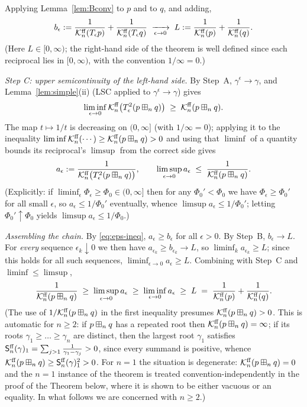 \medskip
Applying Lemma~\ref{lem:Bconv} to $p$ and to $q$, and adding,
\[
b_\epsilon:=\frac{1}{\mathcal{K}^{\mathrm{ff}}_n(T_\epsilon p)}+\frac{1}{\mathcal{K}^{\mathrm{ff}}_n(T_\epsilon q)}
\;\xrightarrow[\epsilon\to0]{}\;
L:=\frac{1}{\mathcal{K}^{\mathrm{ff}}_n(p)}+\frac{1}{\mathcal{K}^{\mathrm{ff}}_n(q)} .
\]
(Here $L\in[0,\infty)$; the right-hand side of the theorem is well defined since
each reciprocal lies in $[0,\infty)$, with the convention $1/\infty=0$.)

\medskip
\noindent\textit{Step C: upper semicontinuity of the left-hand side.}
By Step~A, $\gamma^\epsilon\to\gamma$, and Lemma~\ref{lem:simple}(ii) (LSC applied
to $\gamma^\epsilon\to\gamma$) gives
\[
\liminf_{\epsilon\to 0}\mathcal{K}^{\mathrm{ff}}_n\bigl(T_\epsilon^2(p\boxplus_n q)\bigr)\;\ge\;\mathcal{K}^{\mathrm{ff}}_n(p\boxplus_n q).
\]
The map $t\mapsto 1/t$ is decreasing on $(0,\infty]$ (with $1/\infty=0$); applying
it to the inequality $\liminf \mathcal{K}^{\mathrm{ff}}_n(\cdots)\ge\mathcal{K}^{\mathrm{ff}}_n(p\boxplus_n q)>0$ and
using that $\liminf$ of a quantity bounds its reciprocal's $\limsup$ from the
correct side gives
\[
a_\epsilon:=\frac{1}{\mathcal{K}^{\mathrm{ff}}_n\bigl(T_\epsilon^2(p\boxplus_n q)\bigr)},\qquad
\limsup_{\epsilon\to 0}a_\epsilon\;\le\;\frac{1}{\mathcal{K}^{\mathrm{ff}}_n(p\boxplus_n q)}.
\]
(Explicitly: if $\liminf_\epsilon\Phi_\epsilon\ge\Phi_0\in(0,\infty]$ then for any
$\Phi_0'<\Phi_0$ we have $\Phi_\epsilon\ge\Phi_0'$ for all small $\epsilon$, so
$a_\epsilon\le 1/\Phi_0'$ eventually, whence $\limsup a_\epsilon\le 1/\Phi_0'$;
letting $\Phi_0'\uparrow\Phi_0$ yields $\limsup a_\epsilon\le 1/\Phi_0$.)

\medskip
\noindent\textit{Assembling the chain.}
By \eqref{eq:eps-ineq}, $a_\epsilon\ge b_\epsilon$ for all $\epsilon>0$. By Step~B,
$b_\epsilon\to L$. For \emph{every} sequence $\epsilon_k\downarrow 0$ we then have
$a_{\epsilon_k}\ge b_{\epsilon_k}\to L$, so $\liminf_{k}a_{\epsilon_k}\ge L$;
since this holds for all such sequences, $\liminf_{\epsilon\to0}a_\epsilon\ge L$.
Combining with Step~C and $\liminf\le\limsup$,
\[
\frac{1}{\mathcal{K}^{\mathrm{ff}}_n(p\boxplus_n q)}
\;\ge\;\limsup_{\epsilon\to 0}a_\epsilon
\;\ge\;\liminf_{\epsilon\to 0}a_\epsilon
\;\ge\;L
\;=\;\frac{1}{\mathcal{K}^{\mathrm{ff}}_n(p)}+\frac{1}{\mathcal{K}^{\mathrm{ff}}_n(q)}.
\]
(The use of $1/\mathcal{K}^{\mathrm{ff}}_n(p\boxplus_n q)$ in the first inequality presumes
$\mathcal{K}^{\mathrm{ff}}_n(p\boxplus_n q)>0$. This is automatic for $n\ge 2$: if $p\boxplus_n q$ has
a repeated root then $\mathcal{K}^{\mathrm{ff}}_n(p\boxplus_n q)=\infty$; if its roots
$\gamma_1\ge\dots\ge\gamma_n$ are distinct, then the largest root $\gamma_1$
satisfies $\mathsf{S}^{\mathrm{ff}}_n(\gamma)_1=\sum_{j>1}\frac{1}{\gamma_1-\gamma_j}>0$, since
every summand is positive, whence $\mathcal{K}^{\mathrm{ff}}_n(p\boxplus_n q)\ge\mathsf{S}^{\mathrm{ff}}_n(\gamma)_1^2>0$.
For $n=1$ the situation is degenerate: $\mathcal{K}^{\mathrm{ff}}_n(p\boxplus_n q)=0$ and the
$n=1$ instance of the theorem is treated convention-independently in the proof of
the Theorem below, where it is shown to be either vacuous or an equality. In what
follows we are concerned with $n\ge2$.)

